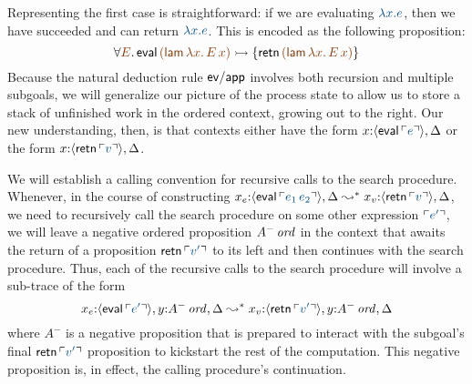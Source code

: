 Representing the first case is straightforward: if we are evaluating
$\obj{\lambda x.e}$, then we have succeeded and can return
$\obj{\lambda x.e}$.  This is encoded as the following proposition:
\[
\forall \lf{E}.\,
{\sf eval}\,\lf{({\sf lam}\,\lambda x.\,E\,x)}
   \lefti \{ {\sf retn}\,\lf{({\sf lam}\,\lambda x.\,E\,x)} \}
\]
Because the natural deduction rule ${\sf ev/app}$ 
involves both recursion and multiple subgoals,
we will generalize our picture of the process state to allow us to store a
stack of unfinished work in the ordered context, growing out to the
right. Our new understanding, then, is that contexts either have the
form $x{:}\susp{{\sf eval}\,\interp{e}}, \Delta$ or the form $x{:}\susp{{\sf
  retn}\,\interp{v}}, \Delta$. 

We will establish a calling convention for recursive calls to the
search procedure. Whenever, in the course of constructing
$x_e{:}\susp{{\sf eval}\,\interp{e_1\,e_2}}, \Delta \leadsto^*
x_v{:}\susp{{\sf retn}\,\interp{v}}, \Delta$, we need to recursively
call the search procedure on some other expression $\interp{e'}$, we
will leave a negative ordered proposition ${A^-}\,{{\it ord}}$ in the
context that awaits the return of a proposition ${\sf
  retn}\,\interp{v'}$ to its left and then continues with the search
procedure. Thus, each of the recursive calls to the search procedure
will involve a sub-trace of the form
%
\[x_e{:}\susp{{\sf eval}\,\interp{e'}}, y{:}\istrue{A^-}, \Delta
  \leadsto^*
  x_v{:}\susp{{\sf retn}\,\interp{v'}}, y{:}\istrue{A^-}, \Delta\]
%
  where $A^-$ is a negative proposition that is prepared to interact
  with the subgoal's final ${\sf retn}\,\interp{v'}$ proposition to
  kickstart the rest of the computation.  This negative proposition
  is, in effect, the calling procedure's continuation.

